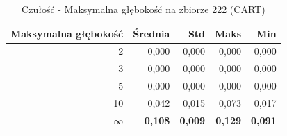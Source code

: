 \begin{table}[htbp]
\centering
\small
\setlength{\tabcolsep}{6pt}
\renewcommand{\arraystretch}{1.2}
\caption{Czułość - Maksymalna głębokość na zbiorze 222 (CART)}
\label{tab:CART_max_depth_222_recall}
\begin{tabular}{r|r|r|r|r}
\toprule
Maksymalna głębokość & Średnia & Std & Maks & Min \\
\hline
2 & 0,000 & 0,000 & 0,000 & 0,000 \\
3 & 0,000 & 0,000 & 0,000 & 0,000 \\
5 & 0,000 & 0,000 & 0,000 & 0,000 \\
10 & 0,042 & 0,015 & 0,073 & 0,017 \\
\textbf{$\infty$} & \textbf{0,108} & \textbf{0,009} & \textbf{0,129} & \textbf{0,091} \\
\bottomrule
\end{tabular}
\end{table}